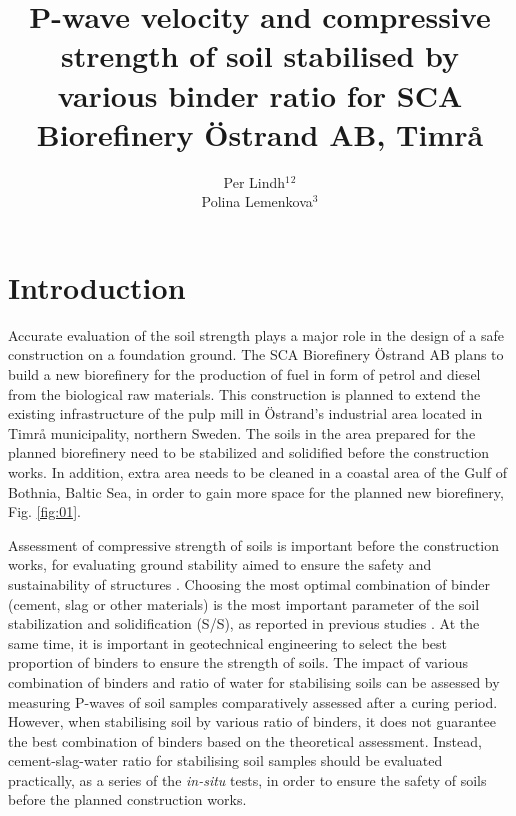\documentclass[10pt,twoside,twocolumn,a4paper]{article}
\title{P-wave velocity and compressive strength of soil stabilised by various binder ratio for SCA Biorefinery Östrand AB, Timrå}
\author{Per Lindh$^{1}$$^{2}$\email{per.a.lindh@gmail.com} \\ Polina Lemenkova$^{3}$\email{polina.lemenkova@ulb.be}}
\begin{document}
\maketitle


\section{Introduction}

Accurate evaluation of the soil strength plays a major role in the design of a safe construction on a foundation ground. The SCA Biorefinery Östrand AB plans to build a new biorefinery for the production of fuel in form of petrol and diesel from the biological raw materials. This construction is planned to extend the existing infrastructure of the pulp mill in Östrand's industrial area located in Timrå municipality, northern Sweden. The soils in the area prepared for the planned biorefinery need to be stabilized and solidified before the construction works. In addition, extra area needs to be cleaned in a coastal area of the Gulf of Bothnia, Baltic Sea, in order to gain more space for the planned new biorefinery, Fig. \ref{fig:01}. 

Assessment of compressive strength of soils is important before the construction works, for evaluating ground stability aimed to ensure the safety and sustainability of structures \cite{Czarnecki}. Choosing the most optimal combination of binder (cement, slag or other materials) is the most important parameter of the soil stabilization and solidification (S/S), as reported in previous studies \cite{Lindh2001,Xizhong,LindhWinter}. At the same time, it is important in geotechnical engineering to select the best proportion of binders to ensure the strength of soils. The impact of various combination of binders and ratio of water for stabilising soils can be assessed by measuring P-waves of soil samples comparatively assessed after a curing period. However, when stabilising soil by various ratio of binders, it does not guarantee the best combination of binders based on the theoretical assessment. Instead, cement-slag-water ratio for stabilising soil samples should be evaluated practically, as a series of the \emph{in-situ} tests, in order to ensure the safety of soils before the planned construction works.
\end{document}
